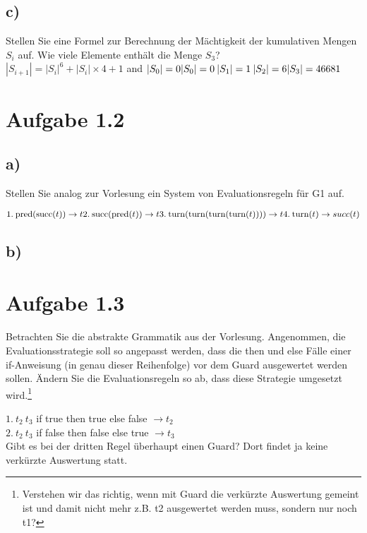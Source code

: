 \documentclass[12pt,a4paper]{article}
\begin{document}
\subsection*{c)}
Stellen Sie eine Formel zur Berechnung der Mächtigkeit der kumulativen Mengen $S_i$ auf.
Wie viele Elemente enthält die Menge $S_3$?
\\
$ |S_{i+1}|=|S_i|^6 + |S_i| \times 4 + 1$ and $|S_0| = 0
\\|S_0|=0 \: |S_1|=1 \: |S_2|=6
\\|S_3| = 46681 $

\section*{Aufgabe 1.2}

\subsection*{a)}
Stellen Sie analog zur Vorlesung ein System von Evaluationsregeln für G1 auf.

$1. \:\text{pred}(\text{succ}(t)) \rightarrow t 
\\
2. \:\text{succ}(\text{pred}(t)) \rightarrow t 
\\
3. \: \text{turn}(\text{turn}(\text{turn}(\text{turn}(t)))) \rightarrow t
\\
4. \: \text{turn}(t) \rightarrow succ(t)
$
\subsection*{b)}

\section*{Aufgabe 1.3}
Betrachten Sie die abstrakte Grammatik aus der Vorlesung. Angenommen, die Evaluationsstrategie soll so angepasst werden, dass die then und else Fälle einer if-Anweisung (in genau dieser Reihenfolge) vor dem Guard ausgewertet werden sollen. Ändern Sie die Evaluationsregeln so ab, dass diese Strategie umgesetzt wird.\footnote{Verstehen wir das richtig, wenn mit Guard die verkürzte Auswertung gemeint ist und damit nicht mehr z.B. t2 ausgewertet werden muss, sondern nur noch t1?}

$1. \: t_2 \: t_3$ if true then true else false $\rightarrow t_2 $
\\
$2. \: t_2 \: t_3$ if false then false else true $\rightarrow t_3 $
\\
Gibt es bei der dritten Regel überhaupt einen Guard? Dort findet ja keine verkürzte Auswertung statt.
\end{document}
